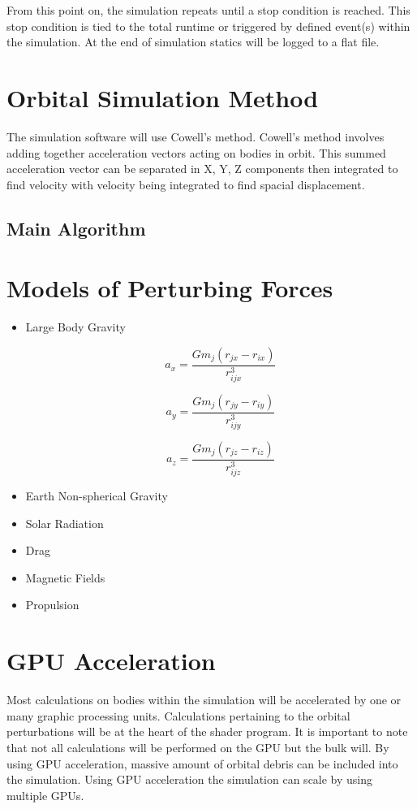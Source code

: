 \documentclass{article}
\begin{document}
  From this point on, the simulation repeats until a stop condition is reached. This stop condition is tied to the total runtime or triggered by defined event(s) within the simulation. At the end of simulation statics will be logged to a flat file.
  
  \section{Orbital Simulation Method}
  
  The simulation software will use Cowell’s method. Cowell’s method involves adding together acceleration vectors acting on bodies in orbit. This summed acceleration vector can be separated in X, Y, Z components then integrated to find velocity with velocity being integrated to find spacial displacement. 
  
  \subsection{Main Algorithm}
  
  \section{Models of Perturbing Forces}
  
  \begin{itemize}
  	\item Large Body Gravity

	\[ a_x = \frac{Gm_j(r_{jx} - r_{ix})}{r^3_{ijx}} \]  	
	
	\[ a_y = \frac{Gm_j(r_{jy} - r_{iy})}{r^3_{ijy}} \]
	
	\[ a_z = \frac{Gm_j(r_{jz} - r_{iz})}{r^3_{ijz}} \]  	
  	
  	\item Earth Non-spherical Gravity
  	\item Solar Radiation
  	\item Drag
  	\item Magnetic Fields
  	\item Propulsion
  \end{itemize}
  
  
  \section{GPU Acceleration}
  
Most calculations on bodies within the simulation will be accelerated by one or many graphic processing units. Calculations pertaining to the orbital perturbations will be at the heart of the shader program. It is important to note that not all calculations will be performed on the GPU but the bulk will. By using GPU acceleration, massive amount of orbital debris can be included into the simulation. Using GPU acceleration the simulation can scale by using multiple GPUs.
  
\end{document}
